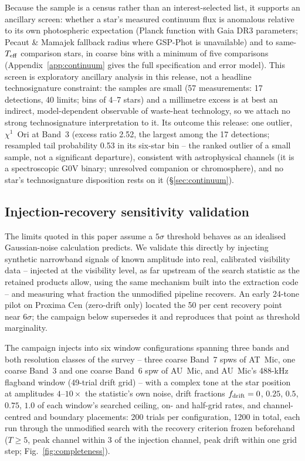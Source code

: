 \documentclass{openjournal}
\begin{document}
Because the sample is a census rather than an interest-selected list,
it supports an ancillary screen: whether a star's measured continuum
flux is anomalous relative to its own photospheric expectation (Planck
function with Gaia DR3 parameters; Pecaut \& Mamajek fallback radius
where GSP-Phot is unavailable) and to same-$T_{\rm eff}$ comparison
stars, in coarse bins with a minimum of five comparisons
(Appendix~\ref{app:continuum} gives the full specification and error
model). This screen is exploratory ancillary analysis in this
release, not a headline technosignature constraint: the samples are
small (57 measurements: 17 detections, 40 limits; bins of 4--7 stars)
and a millimetre excess is at best an indirect, model-dependent
observable of waste-heat technology, so we attach no strong
technosignature interpretation to it. Its outcome this release: one
outlier, $\chi^1$~Ori at Band~3 (excess ratio 2.52, the largest among
the 17 detections; resampled tail probability 0.53 in its six-star
bin -- the ranked outlier of a small sample, not a significant
departure), consistent with astrophysical channels (it is a
spectroscopic G0V binary; unresolved companion or chromosphere), and
no star's technosignature disposition rests on it
(\S\ref{sec:continuum}).

\subsection{Injection-recovery sensitivity validation}
\label{sec:injectrecovery}

The limits quoted in this paper assume a $5\sigma$ threshold behaves
as an idealised Gaussian-noise calculation predicts. We validate this
directly by injecting synthetic narrowband signals of known amplitude
into real, calibrated visibility data -- injected at the visibility
level, as far upstream of the search statistic as the retained
products allow, using the same mechanism built into the extraction
code -- and measuring what fraction the unmodified pipeline recovers.
An early 24-tone pilot on Proxima Cen (zero-drift only) located the
50 per cent recovery point near $6\sigma$; the campaign below
supersedes it and reproduces that point as threshold marginality.

The campaign injects into six window configurations spanning three
bands and both resolution classes of the survey -- three coarse
Band~7 spws of AT~Mic, one coarse Band~3 and one coarse Band~6 spw of
AU~Mic, and AU~Mic's 488-kHz flagband window (49-trial drift grid) --
with a complex tone at the star position at amplitudes $4$--$10\times$
the statistic's own noise, drift fractions $f_{\rm drift}=0$, $0.25$,
$0.5$, $0.75$, $1.0$ of each window's searched ceiling, on- and
half-grid rates, and channel-centred and boundary placements: 200
trials per configuration, 1200 in total, each run through the
unmodified search with the recovery criterion frozen beforehand
($T\geq5$, peak channel within 3 of the injection channel, peak drift
within one grid step; Fig.~\ref{fig:completeness}).
\end{document}
